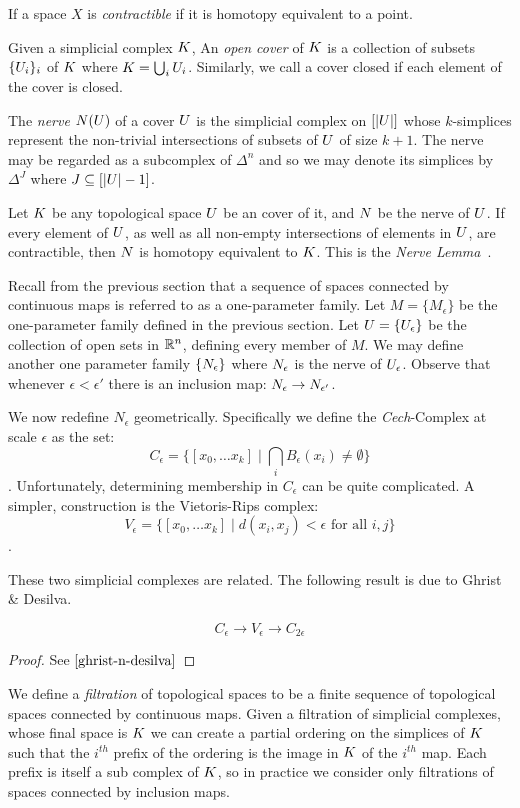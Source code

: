 If a space $X$ is \emph{contractible} if it is homotopy equivalent to a point.

Given a simplicial complex $K$, An \emph{open cover} of $K$ is a collection of subsets $\{U_i\}_i$ of $K$ where $K = \bigcup_i U_i$. Similarly, we call a cover closed if each element of the cover is closed.

The \emph{nerve} $N(U)$ of a cover $U$ is the simplicial complex on $[|U|]$ whose $k$-simplices represent the non-trivial intersections of subsets of $U$ of size $k+1$. The nerve may be regarded as a subcomplex of $\Delta^n$ and so we may denote its simplices by $\Delta^J$ where $J \subseteq [|U|-1]$.

Let $K$ be any topological space $U$ be an cover of it, and $N$ be the nerve of $U$. If every element of $U$, as well as all non-empty intersections of elements in $U$, are contractible, then $N$ is homotopy equivalent to $K$. This is the \emph{Nerve Lemma}~\cite{hatcher}.

Recall from the previous section that a sequence of spaces connected by continuous maps is referred to as a one-parameter family. Let $M = \{M_\epsilon\}$ be the one-parameter family defined in the previous section. Let $U = \{U_\epsilon\}$ be the collection of open sets in $\mathbb{R}^n$, defining every member of $M$. We may define another one parameter family $\{ N_\epsilon \}$ where $N_\epsilon$ is the nerve of $U_\epsilon$. Observe that whenever $\epsilon < \epsilon'$ there is an inclusion map: $N_\epsilon \rightarrow N_{\epsilon'}$.

We now redefine $N_{\epsilon}$ geometrically. Specifically we define the \emph{Cech}-Complex at scale $\epsilon$ as the set:
\[ C_\epsilon = \{ [ x_0, \ldots x_k] \mid \bigcap_i B_\epsilon(x_i)  \neq \emptyset \} \].
Unfortunately, determining membership in $C_\epsilon$ can be quite complicated. A simpler, construction is the Vietoris-Rips complex:
\[ V_\epsilon = \{ [x_0, \ldots x_k] \mid d(x_i, x_j) < \epsilon \textrm{ for all } i,j  \} \].

These two simplicial complexes are related. The following result is due to Ghrist \& Desilva.
\begin{theorem}
\[ C_\epsilon \rightarrow V_\epsilon \rightarrow C_{2\epsilon} \]
\end{theorem}
\begin{proof}
See $\cite{ghrist-n-desilva}$
\end{proof}

We define a \emph{filtration} of topological spaces to be a finite sequence of topological spaces connected by
continuous maps. Given a filtration of simplicial complexes, whose final space is $K$ we can create a  
partial ordering on the simplices of $K$ such that the $i^{th}$ prefix of the ordering is the image in $K$ of the $i^{th}$ map. Each prefix is itself a sub complex of $K$, so in practice we consider only filtrations of spaces connected by inclusion maps.

